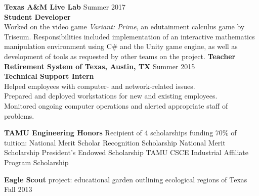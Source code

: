 \documentclass[12pt]{article}
\begin{document}
\begin{flushleft}
\begin{outline}[compactitem]
        \1 \textbf{Texas A\&M Live Lab} \hfill Summer 2017
        \\ \textbf{Student Developer}
        \\ Worked on the video game \textit{Variant: Prime}, an edutainment calculus game by Triseum. Responsibilities included implementation of an interactive mathematics manipulation environment using C\# and the Unity game engine, as well as development of tools as requested by other teams on the project.
        \1 \textbf{Teacher Retirement System of Texas, Austin, TX} \hfill Summer 2015
        \\ \textbf{Technical Support Intern}
        \\ Helped employees with computer- and network-related issues.
        \\ Prepared and deployed workstations for new and existing employees.
        \\ Monitored ongoing computer operations and alerted appropriate staff of problems.

        \1 \textbf{TAMU Engineering Honors}
        \1 Recipient of 4 scholarships funding 70\% of tuition:
        \2 National Merit Scholar Recognition Scholarship
        \2 National Merit Scholarship
        \2 President's Endowed Scholarship
        \2 TAMU CSCE Industrial Affiliate Program Scholarship

        \1 \textbf{Eagle Scout} project: educational garden outlining ecological regions of Texas \hfill Fall 2013

    \end{outline}
\end{flushleft}
\end{document}

